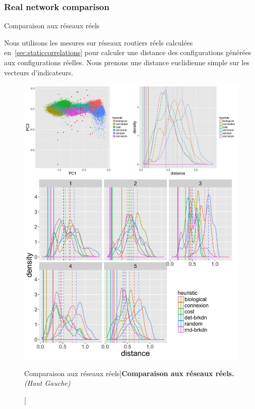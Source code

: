 \subsubsection{Real network comparison}{Comparaison aux réseaux réels}


Nous utilisons les mesures sur réseaux routiers réels calculées en~\ref{sec:staticcorrelations} pour calculer une distance des configurations générées aux configurations réelles. Nous prenons une distance euclidienne simple sur les vecteurs d'indicateurs.




\begin{figure}
\includegraphics[width=\linewidth]{Figures/Final/7-1-2-fig-networkgrowth-realdistance}
\caption[][Comparaison aux réseaux réels]{}{\textbf{Comparaison aux réseaux réels.} \textit{(Haut Gauche)}\label{fig:networkgrowth:realdistance}}
\end{figure}



